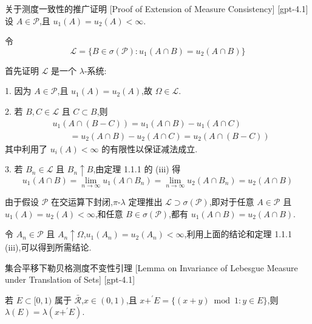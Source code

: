 \documentclass[UTF8]{ctexart}
\begin{document}
    
    
    \begin{prf}
        {关于测度一致性的推广证明}
        [Proof of Extension of Measure Consistency]
        [gpt-4.1]
        设 $A \in \mathcal{P}$,且 $
u_1(A) = 
u_2(A) < \infty$.

令
\[
\mathcal{L} = \{ B \in \sigma(\mathcal{P}) : 
u_1(A \cap B) = 
u_2(A \cap B) \}
\]

首先证明 $\mathcal{L}$ 是一个 $\lambda$-系统:

1. 因为 $A \in \mathcal{P}$,且 $
u_1(A) = 
u_2(A)$,故 $\Omega \in \mathcal{L}$.

2. 若 $B, C \in \mathcal{L}$ 且 $C \subset B$,则
\[
\begin{array}{rl}
& 
u_1(A \cap (B - C)) = 
u_1(A \cap B) - 
u_1(A \cap C) \\
& \qquad = 
u_2(A \cap B) - 
u_2(A \cap C) = 
u_2(A \cap (B - C))
\end{array}
\]
其中利用了 $
u_i(A) < \infty$ 的有限性以保证减法成立.

3. 若 $B_n \in \mathcal{L}$ 且 $B_n \uparrow B$,由定理 1.1.1 的 (iii) 得
\[
u_1(A \cap B) = \lim_{n \to \infty} 
u_1(A \cap B_n) = \lim_{n \to \infty} 
u_2(A \cap B_n) = 
u_2(A \cap B)
\]

由于假设 $\mathcal{P}$ 在交运算下封闭,$\pi$-$\lambda$ 定理推出 $\mathcal{L} \supset \sigma(\mathcal{P})$,即对于任意 $A \in \mathcal{P}$ 且 $
u_1(A) = 
u_2(A) < \infty$,和任意 $B \in \sigma(\mathcal{P})$,都有 $
u_1(A \cap B) = 
u_2(A \cap B)$.

令 $A_n \in \mathcal{P}$ 且 $A_n \uparrow \Omega$,$
u_1(A_n) = 
u_2(A_n) < \infty$,利用上面的结论和定理 1.1.1 (iii),可以得到所需结论.

    \end{prf}
    
    
    
    \begin{lma}
        {集合平移下勒贝格测度不变性引理}
        [Lemma on Invariance of Lebesgue Measure under Translation of Sets]
        [gpt-4.1]
        
若 $E \subset [ 0 , 1 )$ 属于 $\bar { \mathcal { R } }$,$x \in ( 0 , 1 )$,且 $x + ^ { \prime } E = \{ ( x + y ) \bmod 1 : y \in E \}$,则 $\lambda ( E ) = \lambda ( x + ^ { \prime } E )$.

    \end{lma}
    
\end{document}

